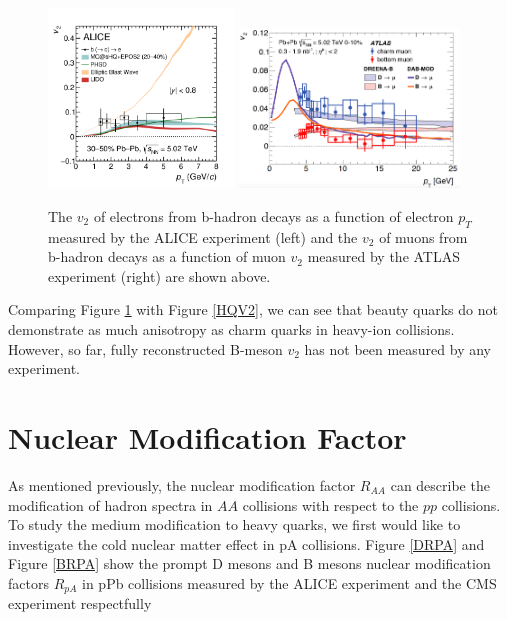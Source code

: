 \begin{figure}[hbtp]
\begin{center}
\includegraphics[width=0.44\textwidth]{Figures/Chapter2/ALICENPEv2.png}
\includegraphics[width=0.52\textwidth]{Figures/Chapter2/ATLASNPMUv2.png}
\caption{The $v_2$ of electrons from b-hadron decays as a function of electron $p_T$ measured by the ALICE experiment (left) and the $v_2$ of muons from b-hadron decays as a function of muon $v_2$ measured by the ATLAS experiment (right) are shown above.}
\label{BeautyEV2}
\end{center}
\end{figure}   


Comparing Figure \ref{BeautyEV2} with Figure \ref{HQV2}, we can see that beauty quarks do not demonstrate as much anisotropy as charm quarks in heavy-ion collisions. However, so far, fully reconstructed B-meson $v_2$ has not been measured by any experiment. 



\section{Nuclear Modification Factor}

As mentioned previously, the nuclear modification factor $R_{AA}$ can describe the modification of hadron spectra in $AA$ collisions with respect to the $pp$ collisions. To study the medium modification to heavy quarks, we first would like to investigate the cold nuclear matter effect in pA collisions. Figure \ref{DRPA} and Figure \ref{BRPA} show the prompt D mesons and B mesons nuclear modification factors $R_{pA}$ in pPb collisions measured by the ALICE experiment \cite{ALICEDRPARef} and the CMS experiment \cite{CMSBRPARef} respectfully



